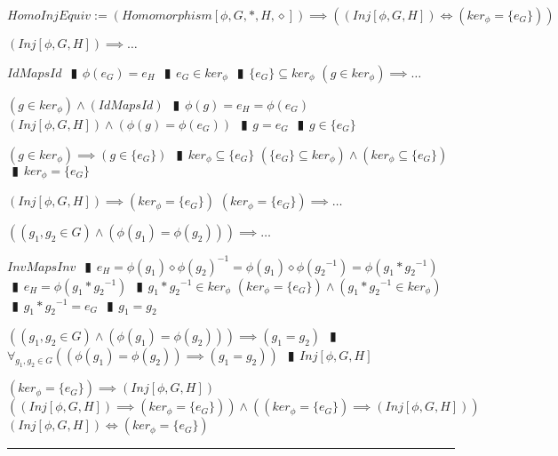 \documentclass{book}
\newcommand{\abr}{:=}
\newcommand{\pipe}{$\phantom{(}\vrectangleblack\phantom{)}$}
\begin{document}
$HomoInjEquiv \abr (Homomorphism[\phi, G, *, H, \diamond]) \implies ((Inj[\phi, G, H]) \iff (ker_\phi = \{e_G\}))$
\begin{enumerate}
  \lit $(Inj[\phi, G, H]) \implies \ldots$
  \begin{enumerate}
    \lit $IdMapsId$ \pipe $\phi(e_G) = e_H$ \pipe $e_G \in ker_\phi$ \pipe $\{e_G\} \subseteq ker_\phi$
    \lit $(g \in ker_\phi) \implies \ldots$
    \begin{enumerate}
      \lit $(g \in ker_\phi) \land (IdMapsId)$ \pipe $\phi(g) = e_H = \phi(e_G)$
      \lit $(Inj[\phi, G, H]) \land (\phi(g) = \phi(e_G))$ \pipe $g = e_G$ \pipe $g \in \{e_G\}$
    \end{enumerate}
    \lit $(g \in ker_\phi) \implies (g \in \{e_G\})$ \pipe $ker_\phi \subseteq \{e_G\}$
    \lit $(\{e_G\} \subseteq ker_\phi) \land (ker_\phi \subseteq \{e_G\})$ \pipe $ker_\phi = \{e_G\}$
  \end{enumerate}
  \lit $(Inj[\phi, G, H]) \implies (ker_\phi = \{e_G\})$
  \lit $(ker_\phi = \{e_G\}) \implies \ldots$
  \begin{enumerate}
    \lit $((g_1, g_2 \in G) \land (\phi(g_1) = \phi(g_2))) \implies \ldots$
    \begin{enumerate}
      \lit $InvMapsInv$ \pipe $e_H = \phi(g_1) \diamond \phi(g_2)^{-1} = \phi(g_1) \diamond \phi({g_2}^{-1}) = \phi(g_1 * {g_2}^{-1})$ \pipe $e_H = \phi(g_1 * {g_2}^{-1})$ \pipe $g_1 * {g_2}^{-1} \in ker_\phi$
      \lit $(ker_\phi = \{e_G\}) \land (g_1 * {g_2}^{-1} \in ker_\phi)$ \pipe $g_1 * {g_2}^{-1} = e_G$ \pipe $g_1 = g_2$
    \end{enumerate}
    \lit $((g_1, g_2 \in G) \land (\phi(g_1) = \phi(g_2))) \implies (g_1 = g_2)$ \pipe $\forall_{g_1, g_2 \in G}((\phi(g_1) = \phi(g_2)) \implies (g_1 = g_2))$ \pipe $Inj[\phi, G, H]$
  \end{enumerate}
  \lit $(ker_\phi = \{e_G\}) \implies (Inj[\phi, G, H])$
  \lit $((Inj[\phi, G, H]) \implies (ker_\phi = \{e_G\})) \land ((ker_\phi = \{e_G\}) \implies (Inj[\phi, G, H]))$
  \lit $(Inj[\phi, G, H]) \iff (ker_\phi = \{e_G\})$
\end{enumerate} \vspace{.75mm} \hrule \vspace{.75mm} \ \\
\end{document}
